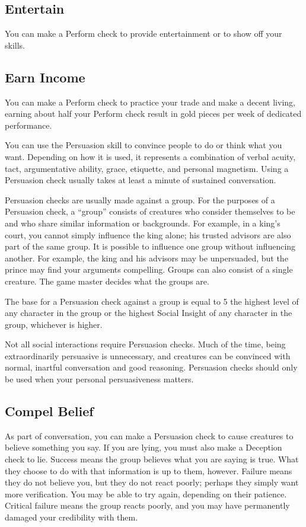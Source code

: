     \subsection{Entertain}
        You can make a Perform check to provide entertainment or to show off your skills.

    \subsection{Earn Income}
        You can make a Perform check to practice your trade and make a decent living, earning about half your Perform check result in gold pieces per week of dedicated performance.

\newpage
{}
        You can use the Persuasion skill to convince people to do or think what you want. Depending on how it is used, it represents a combination of verbal acuity, tact, argumentative ability, grace, etiquette, and personal magnetism. Using a Persuasion check usually takes at least a minute of sustained conversation.

        Persuasion checks are usually made against a group. For the purposes of a Persuasion check, a ``group'' consists of creatures who consider themselves to be  and who share similar information or backgrounds. For example, in a king's court, you cannot simply influence the king alone; his trusted advisors are also part of the same group. It is possible to influence one group without influencing another. For example, the king and his advisors may be unpersuaded, but the prince may find your arguments compelling. Groups can also consist of a single creature. The game master decides what the groups are.

        The base  for a Persuasion check against a group is equal to 5 \add the highest level of any character in the group or the highest Social Insight of any character in the group, whichever is higher.

        Not all social interactions require Persuasion checks. Much of the time, being extraordinarily persuasive is unnecessary, and creatures can be convinced with normal, inartful conversation and good reasoning. Persuasion checks should only be used when your personal persuasiveness matters.

    \subsection{Compel Belief}\label{Compel Belief}
        As part of conversation, you can make a Persuasion check to cause creatures to believe something you say. If you are lying, you must also make a Deception check to lie. Success means the group believes what you are saying is true. What they choose to do with that information is up to them, however. Failure means they do not believe you, but they do not react poorly; perhaps they simply want more verification. You may be able to try again, depending on their patience. Critical failure means the group reacts poorly, and you may have permanently damaged your credibility with them.

